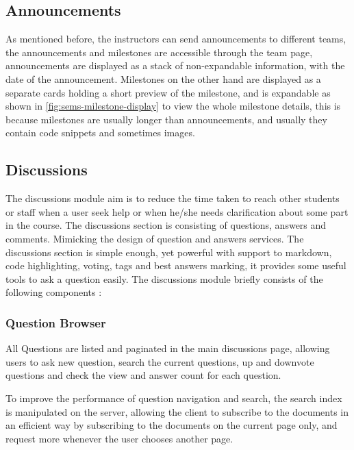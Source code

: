 \subsection{Announcements}
\label{sub:announcements}
As mentioned before, the instructors can send announcements to different teams, the announcements and milestones are accessible through the
team page, announcements are displayed as a stack of non-expandable information, with the date of the announcement. Milestones on the other hand are
displayed as a separate cards holding a short preview of the milestone, and is expandable as shown in \ref{fig:sems-milestone-display} to view
the whole milestone details, this is because milestones are usually longer than announcements, and usually they contain code snippets and sometimes
images.


\subsection{Discussions}
\label{sub:discussions}
The discussions module aim is to reduce the time taken to reach other students or staff when a user seek help or when he/she needs
clarification about some part in the course. The discussions section is consisting of questions, answers and comments. Mimicking the
design of question and answers services. The discussions section is simple enough, yet powerful with support to markdown, code highlighting, voting, tags and
best answers marking, it provides some useful tools to ask a question easily. The discussions module briefly consists of the following components :

\subsubsection{Question Browser}
\label{subs:question-browser}
All Questions are listed and paginated in the main discussions page, allowing users to ask new question, search the current questions, up and
downvote questions and check the view and answer count for each question.

\newParagraph
To improve the performance of question navigation and search, the search index is manipulated on the server, allowing the client to subscribe to
the documents in an efficient way by subscribing to the documents on the current page only, and request more whenever the user chooses another page.


